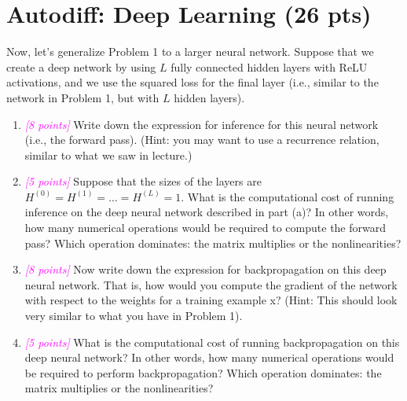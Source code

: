 \documentclass{exam}
\newcommand{\grade}[1]{\small\textcolor{magenta}{\emph{[#1 points]}} \normalsize}
\begin{document}
\section{Autodiff: Deep Learning (26 pts)}
Now, let's generalize Problem 1 to a larger neural network. Suppose that we create a deep network by using $L$ fully connected hidden layers with ReLU activations, and we use the squared loss for the final layer (i.e., similar to the network in Problem 1, but with $L$ hidden layers).
\begin{enumerate}[label=(\alph*)]
\item \grade{8}  Write down the expression for inference for this neural network (i.e., the forward pass). (Hint: you may want to use a recurrence relation, similar to what we saw in lecture.)

\newpage
\item \grade{5} Suppose that the sizes of the layers are $H^{(0)} = H^{(1)} = \dots = H^{(L)} = 1$. What is the computational cost of running inference on the deep neural network described in part (a)? In other words, how many numerical
operations would be required to compute the forward pass? Which operation dominates: the matrix
multiplies or the nonlinearities?

\newpage
\item \grade{8} Now write down the expression for backpropagation on this deep neural network. That is, how would you compute the gradient of the network with
respect to the weights for a training example x? (Hint: This should look very similar to what you have in Problem 1).

\newpage
\item \grade{5} What is the computational cost of running backpropagation on this deep neural network? In other words, how many numerical operations would be required to perform backpropagation? Which operation
dominates: the matrix multiplies or the nonlinearities?

\end{enumerate}
\end{document}
